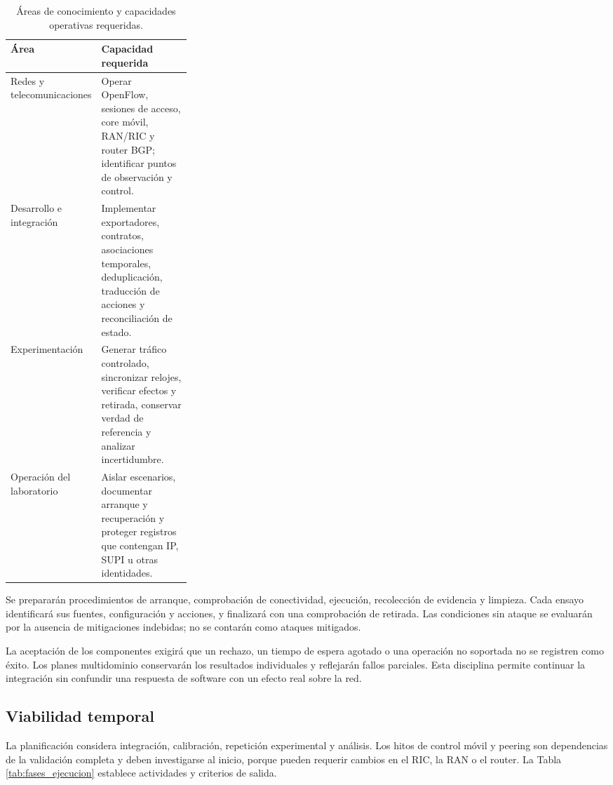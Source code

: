 \begin{table}[H]
    \centering
    \renewcommand{\arraystretch}{1.25}
    \fontsize{10}{12}\selectfont
    \begin{tabular}{@{}>{\raggedright\arraybackslash}p{0.30\linewidth}
        >{\raggedright\arraybackslash}p{}@{}}
        \hline \textbf{Área} & \textbf{Capacidad requerida} \\ \hline
        Redes y telecomunicaciones & Operar OpenFlow, sesiones de acceso, core móvil, RAN/RIC y router BGP; identificar puntos de observación y control. \\ \hline
        Desarrollo e integración & Implementar exportadores, contratos, asociaciones temporales, deduplicación, traducción de acciones y reconciliación de estado. \\ \hline
        Experimentación & Generar tráfico controlado, sincronizar relojes, verificar efectos y retirada, conservar verdad de referencia y analizar incertidumbre. \\ \hline
        Operación del laboratorio & Aislar escenarios, documentar arranque y recuperación y proteger registros que contengan IP, SUPI u otras identidades. \\ \hline
    \end{tabular}
    \caption{Áreas de conocimiento y capacidades operativas requeridas.}
    \label{tab:conocimientos_requeridos}
\end{table}

Se prepararán procedimientos de arranque, comprobación de conectividad, ejecución, recolección de evidencia y limpieza. Cada ensayo identificará sus fuentes, configuración y acciones, y finalizará con una comprobación de retirada. Las condiciones sin ataque se evaluarán por la ausencia de mitigaciones indebidas; no se contarán como ataques mitigados.

La aceptación de los componentes exigirá que un rechazo, un tiempo de espera agotado o una operación no soportada no se registren como éxito. Los planes multidominio conservarán los resultados individuales y reflejarán fallos parciales. Esta disciplina permite continuar la integración sin confundir una respuesta de software con un efecto real sobre la red.

\subsection{Viabilidad temporal}

La planificación considera integración, calibración, repetición experimental y análisis. Los hitos de control móvil y peering son dependencias de la validación completa y deben investigarse al inicio, porque pueden requerir cambios en el RIC, la RAN o el router. La Tabla \ref{tab:fases_ejecucion} establece actividades y criterios de salida.

